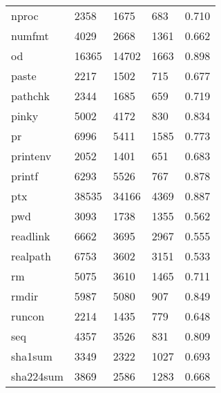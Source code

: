 \begin{longtable}{lp{4.5cm}p{4.5cm}p{4.5cm}p{4.5cm}}
nproc     &                     2358 &         1675 &           683 &                    0.710 \\
numfmt    &                     4029 &         2668 &          1361 &                    0.662 \\
od        &                    16365 &        14702 &          1663 &                    0.898 \\
paste     &                     2217 &         1502 &           715 &                    0.677 \\
pathchk   &                     2344 &         1685 &           659 &                    0.719 \\
pinky     &                     5002 &         4172 &           830 &                    0.834 \\
pr        &                     6996 &         5411 &          1585 &                    0.773 \\
printenv  &                     2052 &         1401 &           651 &                    0.683 \\
printf    &                     6293 &         5526 &           767 &                    0.878 \\
ptx       &                    38535 &        34166 &          4369 &                    0.887 \\
pwd       &                     3093 &         1738 &          1355 &                    0.562 \\
readlink  &                     6662 &         3695 &          2967 &                    0.555 \\
realpath  &                     6753 &         3602 &          3151 &                    0.533 \\
rm        &                     5075 &         3610 &          1465 &                    0.711 \\
rmdir     &                     5987 &         5080 &           907 &                    0.849 \\
runcon    &                     2214 &         1435 &           779 &                    0.648 \\
seq       &                     4357 &         3526 &           831 &                    0.809 \\
sha1sum   &                     3349 &         2322 &          1027 &                    0.693 \\
sha224sum &                     3869 &         2586 &          1283 &                    0.668 \\

\end{longtable}
